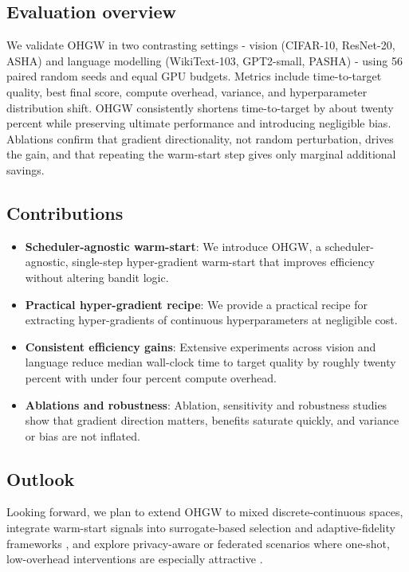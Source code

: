 \documentclass{article}
\begin{document}
\subsection{Evaluation overview}
We validate OHGW in two contrasting settings - vision (CIFAR-10, ResNet-20, ASHA) and language modelling (WikiText-103, GPT2-small, PASHA) - using 56 paired random seeds and equal GPU budgets. Metrics include time-to-target quality, best final score, compute overhead, variance, and hyperparameter distribution shift. OHGW consistently shortens time-to-target by about twenty percent while preserving ultimate performance and introducing negligible bias. Ablations confirm that gradient directionality, not random perturbation, drives the gain, and that repeating the warm-start step gives only marginal additional savings.

\subsection{Contributions}
\begin{itemize}
  \item \textbf{Scheduler-agnostic warm-start}: We introduce OHGW, a scheduler-agnostic, single-step hyper-gradient warm-start that improves efficiency without altering bandit logic.
  \item \textbf{Practical hyper-gradient recipe}: We provide a practical recipe for extracting hyper-gradients of continuous hyperparameters at negligible cost.
  \item \textbf{Consistent efficiency gains}: Extensive experiments across vision and language reduce median wall-clock time to target quality by roughly twenty percent with under four percent compute overhead.
  \item \textbf{Ablations and robustness}: Ablation, sensitivity and robustness studies show that gradient direction matters, benefits saturate quickly, and variance or bias are not inflated.
\end{itemize}

\subsection{Outlook}
Looking forward, we plan to extend OHGW to mixed discrete-continuous spaces, integrate warm-start signals into surrogate-based selection \cite{khazi-2023-deep} and adaptive-fidelity frameworks \cite{jiang-2024-efficient}, and explore privacy-aware or federated scenarios where one-shot, low-overhead interventions are especially attractive \cite{panda-2022-new,khodak-2021-federated}.
\end{document}
